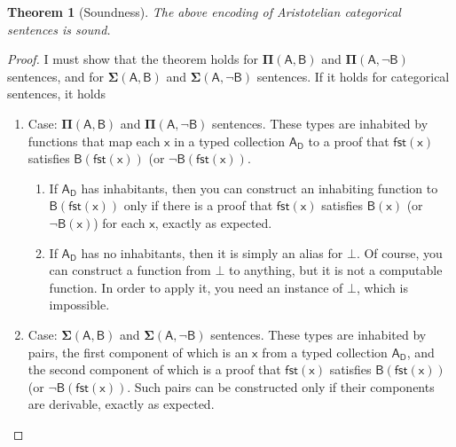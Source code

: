 \documentclass{article}
\newtheorem{theorem}{Theorem}
\newcommand\e{\mathsf}
\def\Empty/{\e{\bot}}
\def\x/{\e{x}}
\def\Domain/{\e{D}}
\newcommand\Dep[2]{\e{#1(#2)}}
\newcommand\First[1]{\e{fst(#1)}}
\newcommand\Gen[2]{\e{#1_{#2}}}
\newcommand\PI[2]{\mathbf{\Pi}\e{(#1, #2)}}
\newcommand\SIG[2]{\mathbf{\Sigma}\e{(#1, #2)}}
\begin{document}
\begin{theorem}[Soundness]
  \label{theorem:soundness}
  The above encoding of Aristotelian categorical sentences is sound.
\end{theorem}

\begin{proof}
  I must show that the theorem holds for $\PI{A}{B}$ and $\PI{A}{\lnot B}$ sentences, and for $\SIG{A}{B}$ and $\SIG{A}{\lnot B}$ sentences. If it holds for categorical sentences, it holds 
  
  \begin{enumerate}
  
    \item Case: $\PI{A}{B}$ and $\PI{A}{\lnot B}$ sentences. These types are inhabited by functions that map each $\x/$ in a typed collection $\Gen{A}{\Domain/}$ to a proof that $\First{x}$ satisfies $\Dep{B}{\First{x}}$ (or $\lnot \Dep{B}{\First{x}}$.
  
      \begin{enumerate} 
      
        \item If $\Gen{A}{\Domain/}$ has inhabitants, then you can construct an inhabiting function to $\Dep{B}{\First{x}}$ only if there is a proof that $\First{x}$ satisfies $\Dep{B}{x}$ (or $\lnot \Dep{B}{x}$) for each $\x/$, exactly as expected.
    
        \item If $\Gen{A}{\Domain/}$ has no inhabitants, then it is simply an alias for $\Empty/$. Of course, you can construct a function from $\Empty/$ to anything, but it is not a computable function. In order to apply it, you need an instance of $\Empty/$, which is impossible.

      \end{enumerate}
  
    \item Case: $\SIG{A}{B}$ and $\SIG{A}{\lnot B}$ sentences. These types are inhabited by pairs, the first component of which is an $\x/$ from a typed collection $\Gen{A}{\Domain/}$, and the second component of which is a proof that $\First{x}$ satisfies $\Dep{B}{\First{x}}$ (or $\lnot \Dep{B}{\First{x}}$. Such pairs can be constructed only if their components are derivable, exactly as expected.
    
  \end{enumerate}
  
\end{proof}


\end{document}
